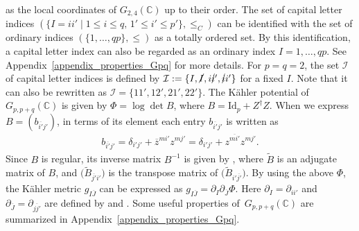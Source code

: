 \documentclass[10pt,a4paper]{amsart}
\numberwithin{equation}{section}
\begin{document}
as the local coordinates of $G_{2,4}(\mathbb{C})$ up to their order. The set of capital letter indices
$
 (
 \{
 I=ii'
\mid
 1
 \leq
 i
 \leq
 q,\,
 1'
 \leq
 i'
 \leq
 p'
 \},
 \leq_{C}
 )
$
can be identified with the set of ordinary indices
$
 (
 \{
 1,\dots,qp
 \},
 \leq
 )
$
as a totally ordered set. By this identification, a capital letter index can also be regarded as an ordinary index
$
 I
 =
 1,
 \dots,
 qp
$.
See Appendix~\ref{appendix_properties_Gpq} for more details.
For $p=q=2$, the set $\mathcal{I}$ of capital letter indices is defined by
$
\mathcal{I}
:=
\{
I,
\cancel{I},
i\cancel{i}',
\cancel{i}i'
\}
$
for a fixed $I$.
Note that it can also be rewritten as
$
\mathcal{I}
=
\{
11',
12',
21',
22'
\}
$.
The K\"ahler potential of $G_{p,p+q}(\mathbb{C})$ is given by
$
 \Phi
 =
 \log
 \det
 B$,
where
$
 B
 =
 \mathrm{Id}_{p}
 +
 Z^{\dagger}
 Z
$.
When we express
$
 B
 =
 (
 b_{\overline{i'}j'}
 )
$,
in terms of its element each entry $b_{\overline{i'}j'}$ is written as
\begin{align}
 b_{\overline{i'}j'}
 =
 \delta_{i'j'}
 +
 \overline{z}^{mi'}
 z^{mj'}
 =
 \delta_{i'j'}
 +
 z^{\overline{mi'}}
 z^{mj'}.
 \label{b_entry}
\end{align}
Since $B$ is regular, its inverse matrix $B^{-1}$ is given by
,
where $\widetilde{B}$ is an adjugate matrix of $B$, and
$
 \bigl(
 \widetilde{B}_{\overline{j'}i'}
 \bigr)
$
is the transpose matrix of
$
 \bigl(
 \widetilde{B}_{i'\overline{j'}}
 \bigr)
$.
By using the above $\Phi$, the K\"ahler metric $g_{I\overline{J}}$ can be expressed as
$
 g_{I\overline{J}}
 =
 \partial_{I}
 \partial_{\overline{J}}
 \Phi
$.
Here $\partial_{I}=\partial_{ii'}$ and $\partial_{\overline{J}}=\partial_{\overline{jj'}}$ are defined by
and
.
Some useful properties of~${G_{p,p+q}(\mathbb{C})}$ are summarized in Appendix~\ref{appendix_properties_Gpq}.
\end{document}
